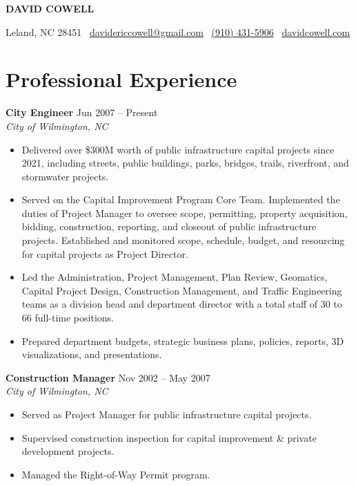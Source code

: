 \documentclass[10pt, letterpaper]{article}
\newcommand{\job}[3]{%
  \vspace{4pt}
  \noindent
  \textbf{#1} \hfill #3 \\
  \textit{#2}
  \vspace{1pt}
}
\begin{document}
\begin{center}
  {\LARGE\bfseries DAVID COWELL}

  \vspace{2pt}

  Leland, NC 28451 \textbar\ \href{mailto:davidericcowell@gmail.com}{davidericcowell@gmail.com} \textbar\ \href{tel:9104315906}{(910) 431-5906} \textbar\ \href{https://davidcowell.com}{davidcowell.com}
\end{center}

\vspace{3pt}

\section{Professional Experience}

\job{City Engineer}{City of Wilmington, NC}{Jun 2007 -- Present}
\begin{itemize}
  \item Delivered over \$300M worth of public infrastructure capital projects since 2021, including streets, public buildings, parks, bridges, trails, riverfront, and stormwater projects.
  \item Served on the Capital Improvement Program Core Team. Implemented the duties of Project Manager to oversee scope, permitting, property acquisition, bidding, construction, reporting, and closeout of public infrastructure projects. Established and monitored scope, schedule, budget, and resourcing for capital projects as Project Director.
  \item Led the Administration, Project Management, Plan Review, Geomatics, Capital Project Design, Construction Management, and Traffic Engineering teams as a division head and department director with a total staff of 30 to 66 full-time positions.
  \item Prepared department budgets, strategic business plans, policies, reports, 3D visualizations, and presentations.
\end{itemize}

\job{Construction Manager}{City of Wilmington, NC}{Nov 2002 -- May 2007}
\begin{itemize}
  \item Served as Project Manager for public infrastructure capital projects.
  \item Supervised construction inspection for capital improvement \& private development projects.
  \item Managed the Right-of-Way Permit program.
\end{itemize}
\end{document}
